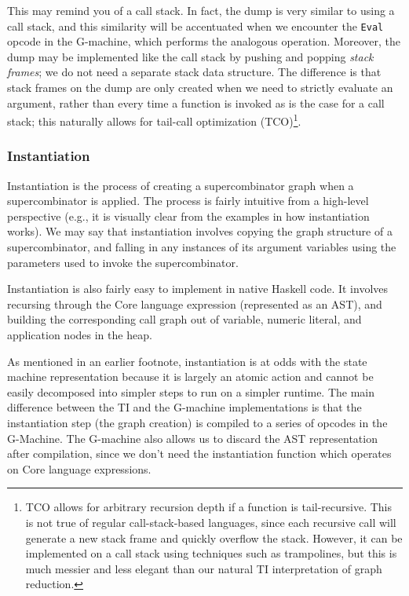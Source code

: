 This may remind you of a call stack. In fact, the dump is very similar to using a call stack, and this similarity will be accentuated when we encounter the \texttt{Eval} opcode in the G-machine, which performs the analogous operation. Moreover, the dump may be implemented like the call stack by pushing and popping \textit{stack frames}; we do not need a separate stack data structure. The difference is that stack frames on the dump are only created when we need to strictly evaluate an argument, rather than every time a function is invoked as is the case for a call stack; this naturally allows for tail-call optimization (TCO)\footnote{TCO allows for arbitrary recursion depth if a function is tail-recursive. This is not true of regular call-stack-based languages, since each recursive call will generate a new stack frame and quickly overflow the stack. However, it can be implemented on a call stack using techniques such as trampolines, but this is much messier and less elegant than our natural TI interpretation of graph reduction.}.

\subsubsection{Instantiation}
\label{sec:ti-instantiation}

Instantiation is the process of creating a supercombinator graph when a supercombinator is applied. The process is fairly intuitive from a high-level perspective (e.g., it is visually clear from the examples in  how instantiation works). We may say that instantiation involves copying the graph structure of a supercombinator, and falling in any instances of its argument variables using the parameters used to invoke the supercombinator.

Instantiation is also fairly easy to implement in native Haskell code. It involves recursing through the Core language expression (represented as an AST), and building the corresponding call graph out of variable, numeric literal, and application nodes in the heap.

As mentioned in an earlier footnote, instantiation is at odds with the state machine representation because it is largely an atomic action and cannot be easily decomposed into simpler steps to run on a simpler runtime. The main difference between the TI and the G-machine implementations is that the instantiation step (the graph creation) is compiled to a series of opcodes in the G-Machine. The G-machine also allows us to discard the AST representation after compilation, since we don't need the instantiation function which operates on Core language expressions.


